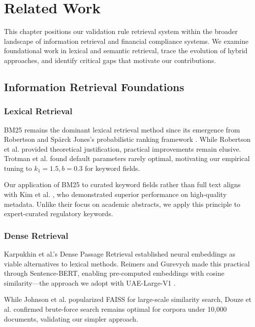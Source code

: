 \chapter{Related Work}\label{ch:related-work}

This chapter positions our validation rule retrieval system within the broader landscape of information retrieval and financial compliance systems. We examine foundational work in lexical and semantic retrieval, trace the evolution of hybrid approaches, and identify critical gaps that motivate our contributions.

\section{Information Retrieval Foundations}

\subsection{Lexical Retrieval}

BM25 remains the dominant lexical retrieval method since its emergence from Robertson and Spärck Jones's probabilistic ranking framework \cite{robertson1976relevance,robertson1994okapi}. While Robertson et al. \cite{robertson2009bm25} provided theoretical justification, practical improvements remain elusive. Trotman et al. \cite{trotman2014improvements} found default parameters rarely optimal, motivating our empirical tuning to $k_1=1.5, b=0.3$ for keyword fields.

Our application of BM25 to curated keyword fields rather than full text aligns with Kim et al. \cite{kim2019structured}, who demonstrated superior performance on high-quality metadata. Unlike their focus on academic abstracts, we apply this principle to expert-curated regulatory keywords.

\subsection{Dense Retrieval}

Karpukhin et al.'s Dense Passage Retrieval \cite{karpukhin2020dense} established neural embeddings as viable alternatives to lexical methods. Reimers and Gurevych \cite{reimers2019sbert} made this practical through Sentence-BERT, enabling pre-computed embeddings with cosine similarity—the approach we adopt with UAE-Large-V1 \cite{uae2023large}.

While Johnson et al. \cite{johnson2019billion} popularized FAISS for large-scale similarity search, Douze et al. \cite{douze2024faiss} confirmed brute-force search remains optimal for corpora under 10,000 documents, validating our simpler approach.

